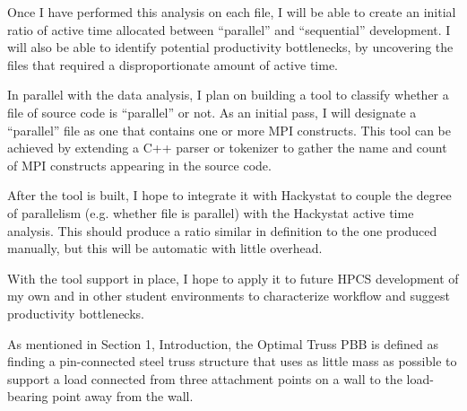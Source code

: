 \documentclass[11pt,twocolumn]{article}
\begin{document}
Once I have performed this analysis on each file, I will be able to
create an initial ratio of active time allocated between ``parallel''
and ``sequential'' development.  I will also be able to identify
potential productivity bottlenecks, by uncovering the files that
required a disproportionate amount of active time.

In parallel with the data analysis, I plan on building a tool to
classify whether a file of source code is ``parallel'' or not.  As an
initial pass, I will designate a ``parallel'' file as one that
contains one or more MPI constructs.  This tool can be achieved by
extending a C++ parser or tokenizer to gather the name and count of
MPI constructs appearing in the source code.

After the tool is built, I hope to integrate it with Hackystat to
couple the degree of parallelism (e.g. whether file is parallel) with
the Hackystat active time analysis.  This should produce a ratio
similar in definition to the one produced manually, but this will be
automatic with little overhead.

With the tool support in place, I hope to apply it to future HPCS
development of my own and in other student environments to
characterize workflow and suggest productivity bottlenecks.

\label{sec:trusspbb}

As mentioned in Section 1, Introduction, the Optimal Truss PBB is
defined as finding a pin-connected steel truss structure that uses as
little mass as possible to support a load connected from three
attachment points on a wall to the load-bearing point away from the
wall.
\end{document}
